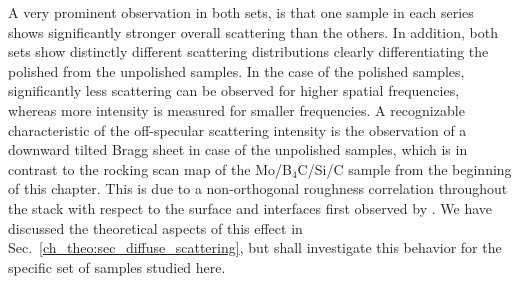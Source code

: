 A very prominent observation in both sets, is that one sample in each series shows significantly stronger overall scattering than the others. In addition, both sets show distinctly different scattering distributions clearly differentiating the polished from the unpolished samples. In the case of the polished samples, significantly less scattering can be observed for higher spatial frequencies, whereas more intensity is measured for smaller frequencies. A recognizable characteristic of the off-specular scattering intensity is the observation of a downward tilted Bragg sheet in case of the unpolished samples, which is in contrast to the rocking scan map of the Mo/B$_4$C/Si/C sample from the beginning of this chapter. This is due to a non-orthogonal roughness correlation throughout the stack with respect to the surface and interfaces first observed by \textcite{gullikson_asymmetric_1999}. We have discussed the theoretical aspects of this effect in Sec.~\ref{ch_theo:sec_diffuse_scattering}, but shall investigate this behavior for the specific set of samples studied here.

